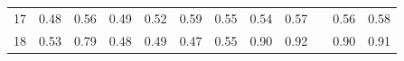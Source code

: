 \documentclass[twoside,11pt]{article}
\begin{document}
\begin{table}[H]
{\begin{tabular}{ccccccccclcc}
\multicolumn{1}{|c|}{17}                                                                          & \multicolumn{1}{c|}{0.48}                                                           & \multicolumn{1}{c|}{0.56}                                                                      & \multicolumn{1}{c|}{0.49}                                                                & \multicolumn{1}{c|}{0.52}                                                                & \multicolumn{1}{c|}{\cellcolor[HTML]{FFCCC9}0.59}                                        & \multicolumn{1}{c|}{0.55}                                                                   & \multicolumn{1}{c|}{0.54}                                                                   & \multicolumn{1}{c|}{\cellcolor[HTML]{ECF4FF}0.57}                                           & \multicolumn{1}{l|}{}                    & \multicolumn{1}{c|}{0.56}                                                                      & \multicolumn{1}{c|}{0.58}                                                                      \\ \cline{1-1}
\multicolumn{1}{|c|}{18}                                                                          & \multicolumn{1}{c|}{0.53}                                                           & \multicolumn{1}{c|}{0.79}                                                                      & \multicolumn{1}{c|}{0.48}                                                                & \multicolumn{1}{c|}{0.49}                                                                & \multicolumn{1}{c|}{0.47}                                                                & \multicolumn{1}{c|}{0.55}                                                                   & \multicolumn{1}{c|}{\cellcolor[HTML]{ECF4FF}0.90}                                           & \multicolumn{1}{c|}{\cellcolor[HTML]{FFCCC9}0.92}                                           & \multicolumn{1}{l|}{}                    & \multicolumn{1}{c|}{0.90}                                                                      & \multicolumn{1}{c|}{0.91}                                                                      \\ \cline{1-1}

\end{tabular}}
\end{table}
\end{document}

